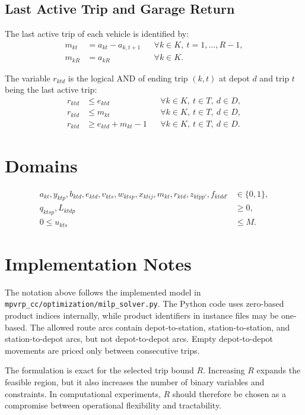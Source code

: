 \documentclass[11pt,a4paper]{article}
\begin{document}
\subsection{Last Active Trip and Garage Return}

The last active trip of each vehicle is identified by:
\begin{align}
    m_{kt} &= a_{kt}-a_{k,t+1}
        && \forall k \in K,\ t=1,\ldots,R-1, \label{eq:last-trip-middle}\\
    m_{kR} &= a_{kR}
        && \forall k \in K. \label{eq:last-trip-final}
\end{align}

The variable \(r_{ktd}\) is the logical AND of ending trip \((k,t)\) at depot
\(d\) and trip \(t\) being the last active trip:
\begin{align}
    r_{ktd} &\leq e_{ktd}
        && \forall k \in K,\ t \in T,\ d \in D, \label{eq:return-end}\\
    r_{ktd} &\leq m_{kt}
        && \forall k \in K,\ t \in T,\ d \in D, \label{eq:return-last}\\
    r_{ktd} &\geq e_{ktd}+m_{kt}-1
        && \forall k \in K,\ t \in T,\ d \in D. \label{eq:return-and}
\end{align}

\section{Domains}

\begin{align}
    a_{kt}, y_{ktp}, b_{ktd}, e_{ktd}, v_{kts}, w_{ktsp}, x_{ktij},
    m_{kt}, r_{ktd}, z_{ktpp'}, f_{ktdd'} &\in \{0,1\}, \\
    q_{ktsp}, L_{ktdp} &\geq 0, \\
    0 \leq u_{kts} &\leq M.
\end{align}

\section{Implementation Notes}

The notation above follows the implemented model in
\texttt{mpvrp\_cc/optimization/milp\_solver.py}. The
Python code uses zero-based product indices internally, while product
identifiers in instance files may be one-based. The allowed route arcs contain
depot-to-station, station-to-station, and station-to-depot arcs, but not
depot-to-depot arcs. Empty depot-to-depot movements are priced only between
consecutive trips.

The formulation is exact for the selected trip bound \(R\). Increasing \(R\)
expands the feasible region, but it also increases the number of binary
variables and constraints. In computational experiments, \(R\) should therefore
be chosen as a compromise between operational flexibility and tractability.
\end{document}
